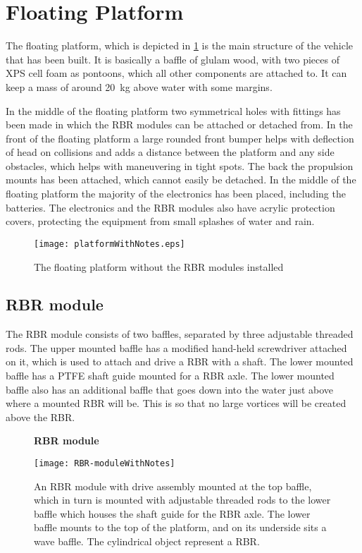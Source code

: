 \section{Floating Platform}
The floating platform, which is depicted in
\cref{fig:floatingPlatform} is the main structure of the vehicle that has been built.
It is basically a baffle of glulam wood, with two pieces of XPS cell foam as
pontoons, which all other components are attached to. It can keep a mass of
around 20~kg above water with some margins.

In the middle of the floating platform two symmetrical holes with fittings has
been made in which the RBR modules can be attached or detached from. In the
front of the floating platform a large rounded front bumper helps with
deflection of head on collisions and adds a distance between the platform and
any side obstacles, which helps with maneuvering in tight spots. The back the
propulsion mounts has been attached, which cannot easily be detached. In the
middle of the floating platform the majority of the electronics has been placed,
including the batteries. The electronics and the RBR modules also have acrylic
protection covers, protecting the equipment from small splashes of water and
rain.
\begin{figure}[h]
   \centering
   \texttt{[image: platformWithNotes.eps]}
   \caption{The floating platform without the RBR modules installed}
   \label{fig:floatingPlatform}
\end{figure}           

\subsection{RBR module}
The RBR module consists of two baffles, separated by three adjustable threaded
rods. The upper mounted baffle has a modified hand-held screwdriver attached on
it, which is used to attach and drive a RBR with a shaft. The lower mounted
baffle has a PTFE shaft guide mounted for a RBR axle. The lower mounted baffle also has an
additional baffle that goes down into the water just above where a mounted RBR
will be. This is so that no large vortices will be created above the RBR.
\begin{figure}[H]
  \centering
  \textbf{RBR module}
  \par\medskip
  \texttt{[image: RBR-moduleWithNotes]}
  \caption{An RBR module with drive assembly mounted at the top baffle,
    which in turn is mounted with adjustable threaded rods to the lower baffle
    which houses the shaft guide for the RBR axle. The lower baffle mounts to the
    top of the platform, and on its underside sits a wave baffle. The cylindrical object
  represent a RBR.}\label{fig:rbr-module}
\end{figure}

